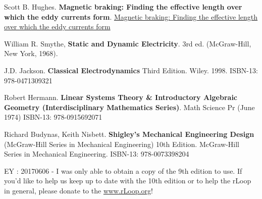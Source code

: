 \documentclass[10pt]{amsart}
\begin{document}
\begin{thebibliography}{9}


Scott B. Hughes.  \textbf{Magnetic braking: Finding the effective length over which the eddy currents form}.  
\href{https://drive.google.com/file/d/0Bwo3W0v5P04LX29XT2NFeVY0a1E/view}{Magnetic braking: Finding the effective length over which the eddy currents form}  


William R. Smythe, \textbf{Static and Dynamic Electricity}.  3rd ed. (McGraw-Hill, New York, 1968).  

J.D. Jackson.  \textbf{Classical Electrodynamics} Third Edition.  Wiley.  1998.   ISBN-13: 978-0471309321

Robert Hermann.  \textbf{Linear Systems Theory \& Introductory Algebraic Geometry (Interdisciplinary Mathematics Series)}.  Math Science Pr (June 1974)
ISBN-13: 978-0915692071

Richard Budynas, Keith Nisbett.  \textbf{Shigley's Mechanical Engineering Design} (McGraw-Hill Series in Mechanical Engineering) 10th Edition.  McGraw-Hill Series in Mechanical Engineering.  ISBN-13: 978-0073398204

EY : 20170606 -  I was only able to obtain a copy of the 9th edition to use.  If you'd like to help us keep up to date with the 10th edition or to help the rLoop in general, please donate to the \href{rLoop}{www.rLoop.org}!


\end{thebibliography}
\end{document}
